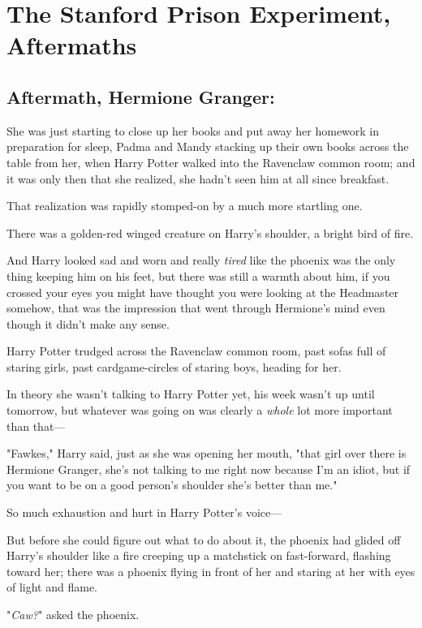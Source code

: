 \chapter{The Stanford Prison Experiment, Aftermaths}

\section{Aftermath, Hermione Granger:}

She was just starting to close up her books and put away her homework in
preparation for sleep, Padma and Mandy stacking up their own books across the
table from her, when Harry Potter walked into the Ravenclaw common room; and it
was only then that she realized, she hadn't seen him at all since breakfast.

That realization was rapidly stomped-on by a much more startling one.

There was a golden-red winged creature on Harry's shoulder, a bright bird of
fire.

And Harry looked sad and worn and really \emph{tired} like the phoenix was the
only thing keeping him on his feet, but there was still a warmth about him, if
you crossed your eyes you might have thought you were looking at the Headmaster
somehow, that was the impression that went through Hermione's mind even though
it didn't make any sense.

Harry Potter trudged across the Ravenclaw common room, past sofas full of
staring girls, past cardgame-circles of staring boys, heading for her.

In theory she wasn't talking to Harry Potter yet, his week wasn't up until
tomorrow, but whatever was going on was clearly a \emph{whole} lot more
important than that—

"Fawkes," Harry said, just as she was opening her mouth, "that girl over there
is Hermione Granger, she's not talking to me right now because I'm an idiot,
but if you want to be on a good person's shoulder she's better than me."

So much exhaustion and hurt in Harry Potter's voice—

But before she could figure out what to do about it, the phoenix had glided off
Harry's shoulder like a fire creeping up a matchstick on fast-forward, flashing
toward her; there was a phoenix flying in front of her and staring at her with
eyes of light and flame.

"\emph{Caw?}" asked the phoenix.

